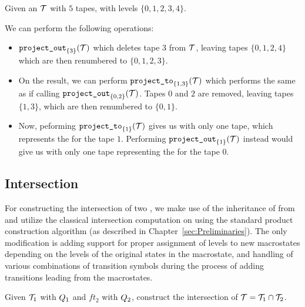 \begin{example}
  Given an \nft $\mathcal{T}$ with $5$ tapes, with levels $\{ 0, 1, 2, 3, 4 \}$.

  We can perform the following operations:
  \begin{itemize}
    \item $\texttt{project\_out}_{\{ 3 \}}(\mathcal{T})$ which deletes tape $3$ from $\mathcal{T}$, leaving tapes $\{ 0, 1, 2, 4 \}$ which are then renumbered to $\{ 0, 1, 2, 3 \}$.
    \item On the result, we can perform $\texttt{project\_to}_{\{ 1, 3 \}}(\mathcal{T})$ which performs the same as if calling $\texttt{project\_out}_{\{ 0, 2 \} }(\mathcal{T})$.
    Tapes $0$ and $2$ are removed, leaving tapes $\{ 1, 3 \}$, which are then renumbered to $\{ 0, 1 \}$.
    \item Now, peforming $\texttt{project\_to}_{\{ 1 \}}(\mathcal{T})$ gives us \nft with only one tape, which represents the \nfa for the tape $1$.
    Performing $\texttt{project\_out}_{\{ 1 \}}(\mathcal{T})$ instead would give us \nft with only one tape representing the \nfa for the tape $0$.
  \end{itemize}

\end{example}

\subsection{Intersection}\label{sec:intersection}

For constructing the intersection of two \nfts, we make use of the inheritance of \nfts from \nfas and utilize the classical intersection computation on \nfa using the standard product construction algorithm (as described in Chapter~\ref{sec:Preliminaries}).
The only modification is adding support for proper assignment of levels to new macrostates depending on the levels of the original \nft states in the macrostate, and handling of various combinations of transition symbols during the process of adding transitions leading from the macrostates.

Given $\mathcal{T}_1$ with $Q_1$ and $ft_2$ with $Q_2$, construct the intersection of $\mathcal{T} = \mathcal{T}_1 \cap \mathcal{T}_2$.

